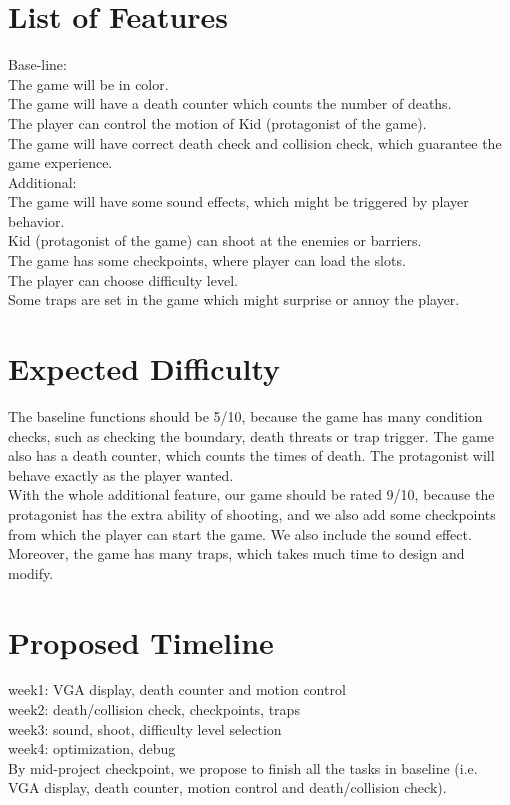 \documentclass[12pt]{article}
\begin{document}
\section{List of Features}
Base-line: \\
The game will be in color. \\
The game will have a death counter which counts the number of deaths. \\
The player can control the motion of Kid (protagonist of the game). \\
The game will have correct death check and collision check, which guarantee the game experience. \\

Additional: \\
The game will have some sound effects, which might be triggered by player behavior. \\
Kid (protagonist of the game) can shoot at the enemies or barriers. \\
The game has some checkpoints, where player can load the slots. \\
The player can choose difficulty level. \\
Some traps are set in the game which might surprise or annoy the player. 

\section{Expected Difficulty}
The baseline functions should be 5/10, because the game has many condition checks, such as checking the boundary, death threats or trap trigger. The game also has a death counter, which counts the times of death. The protagonist will behave exactly as the player wanted. \\

With the whole additional feature, our game should be rated 9/10, because the protagonist has the extra ability of shooting, and we also add some checkpoints from which the player can start the game. We also include the sound effect. Moreover, the game has many traps, which takes much time to design and modify.

\section{Proposed Timeline}
week1: VGA display, death counter and motion control \\
week2: death/collision check, checkpoints, traps \\
week3: sound, shoot, difficulty level selection \\
week4: optimization, debug \\
By mid-project checkpoint, we propose to finish all the tasks in baseline (i.e. VGA display, death counter, motion control and death/collision check).


\newpage


\end{document}
